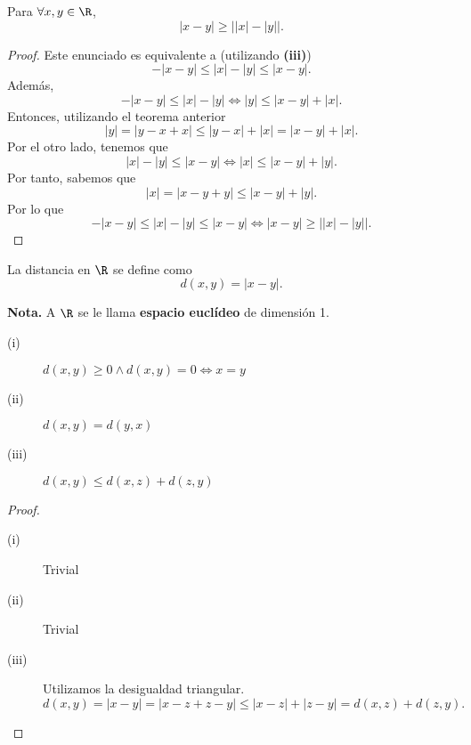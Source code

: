 \begin{fcolorary}
\normalfont Para $\displaystyle \forall x, y \in \R $, 
\[ \left|x - y\right| \geq \left|\left|x\right| - \left|y\right|\right| .\]
\end{fcolorary}

\begin{proof}
Este enunciado es equivalente a (utilizando \textbf{(iii)})
\[- \left|x - y\right| \leq \left|x\right| - \left|y\right| \leq \left|x - y\right| .\]
Además, 
\[- \left|x - y\right|\leq \left|x\right| - \left|y\right| \iff \left|y\right| \leq  \left|x - y\right| + \left|x\right| .\]
Entonces, utilizando el teorema anterior
\[ \left|y\right| = \left|y - x + x\right| \leq \left|y - x\right| + \left|x\right| = \left|x - y\right|+ \left|x\right| .\]
Por el otro lado, tenemos que 
\[ \left|x\right| - \left|y\right| \leq \left|x - y\right| \iff \left|x\right| \leq \left|x - y\right| + \left|y\right| .\]
Por tanto, sabemos que 
\[ \left|x\right| = \left|x - y + y\right| \leq \left|x - y\right| + \left|y\right| .\]
Por lo que 
\[ - \left|x - y\right| \leq \left|x\right| - \left|y\right| \leq \left|x - y\right| \iff |x - y| \geq \left| \left|x\right| - \left|y\right|\right| .\]
\end{proof}

\begin{fdefinition}
\normalfont La distancia en $\displaystyle \R $ se define como 
\[d\left(x,y\right) = \left|x - y\right| .\]
\end{fdefinition}

\textbf{Nota.} A $\displaystyle \R $ se le llama \textbf{espacio euclídeo} de dimensión 1.

\begin{fprop}[]
\normalfont 
\begin{description}
\item[(i)] $\displaystyle d\left(x,y\right)\geq 0 \land d\left(x,y\right) = 0 \iff x = y $ 
\item[(ii)] $\displaystyle d\left(x,y\right) = d\left(y,x\right) $ 
\item[(iii)] $\displaystyle d\left(x,y\right) \leq d\left(x,z\right) + d\left(z,y\right) $ 
\end{description}
\end{fprop}

\begin{proof}
\begin{description}
\item[(i)] Trivial
\item[(ii)] Trivial
\item[(iii)] Utilizamos la desigualdad triangular.
	\[d\left(x,y\right) = \left|x - y\right| = \left|x - z + z - y\right| \leq \left|x - z\right|+ \left|z - y\right| = d\left(x,z\right) + d\left(z,y\right) .\]
\end{description}
\end{proof}

